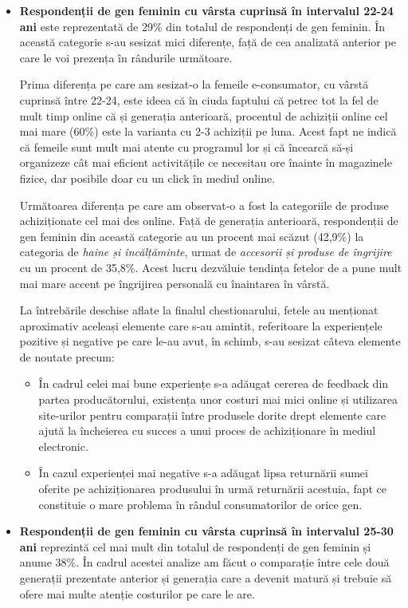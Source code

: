 \documentclass[a4paper, 12pt]{article}
\begin{document}
\begin{itemize}
		\item \textbf{Respondenții de gen feminin cu vârsta cuprinsă în intervalul 22-24 ani} este reprezentată de 29\% din totalul de respondenți de gen feminin. În această categorie s-au sesizat mici diferențe, față de cea analizată anterior pe care le voi prezența în rândurile următoare.
		
		\quad Prima diferența pe care am sesizat-o la femeile e-consumator, cu vârstă cuprinsă între 22-24, este ideea că în ciuda faptului că petrec tot la fel de mult timp online că și generația anterioară, procentul de achiziții online cel mai mare (60\%) este la varianta cu 2-3 achiziții pe luna. Acest fapt ne indică că femeile sunt mult mai atente cu programul lor și că încearcă să-și organizeze cât mai eficient activitățile ce necesitau ore înainte în magazinele fizice, dar posibile doar cu un click în mediul online.
		
		\quad Următoarea diferența pe care am observat-o a fost la categoriile de produse achiziționate cel mai des online. Față de generația anterioară, respondenții de gen feminin din această categorie au un procent mai scăzut (42,9\%) la categoria de \textit{haine și încălțăminte}, urmat de \textit{accesorii și produse de îngrijire} cu un procent de 35,8\%. Acest lucru dezvăluie tendința fetelor de a pune mult mai mare accent pe îngrijirea personală cu înaintarea în vârstă. 
		
		\quad La întrebările deschise aflate la finalul chestionarului, fetele au menționat aproximativ aceleași elemente care s-au amintit, referitoare la experiențele pozitive și negative pe care le-au avut, în schimb, s-au sesizat câteva elemente de noutate precum:
		\begin{itemize}
			\item În cadrul celei mai bune experiențe s-a adăugat cererea de feedback din partea producătorului, existența unor costuri mai mici online și utilizarea site-urilor pentru comparații între produsele dorite drept elemente care ajută la încheierea cu succes a unui proces de achiziționare în mediul electronic.
			\item În cazul experienței mai negative s-a adăugat lipsa returnării sumei oferite pe achiziționarea produsului în urmă returnării acestuia, fapt ce constituie o mare problema în rândul consumatorilor de orice gen.
		\end{itemize}
	
		\item \textbf{Respondenții de gen feminin cu vârsta cuprinsă în intervalul 25-30 ani} reprezintă cel mai mult din totalul de respondenți de gen feminin și anume 38\%. În cadrul acestei analize am făcut o comparație între cele două generații prezentate anterior și generația care a devenit matură și trebuie să ofere mai multe atenție costurilor pe care le are.
		

\end{itemize}
\end{document}
